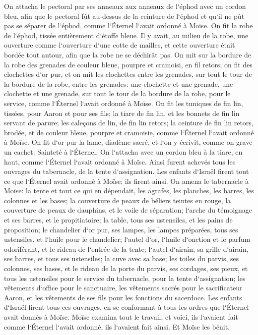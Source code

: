 \verse On attacha le pectoral par ses anneaux aux anneaux de l`éphod avec un cordon bleu, afin que le pectoral fût au-dessus de la ceinture de l`éphod et qu`il ne pût pas se séparer de l`éphod, comme l`Éternel l`avait ordonné à Moïse. 
\verse On fit la robe de l`éphod, tissée entièrement d`étoffe bleue. 
\verse Il y avait, au milieu de la robe, une ouverture comme l`ouverture d`une cotte de mailles, et cette ouverture était bordée tout autour, afin que la robe ne se déchirât pas. 
\verse On mit sur la bordure de la robe des grenades de couleur bleue, pourpre et cramoisi, en fil retors; 
\verse on fit des clochettes d`or pur, et on mit les clochettes entre les grenades, sur tout le tour de la bordure de la robe, entre les grenades: 
\verse une clochette et une grenade, une clochette et une grenade, sur tout le tour de la bordure de la robe, pour le service, comme l`Éternel l`avait ordonné à Moïse. 
\verse On fit les tuniques de fin lin, tissées, pour Aaron et pour ses fils; 
\verse la tiare de fin lin, et les bonnets de fin lin servant de parure; les caleçons de lin, de fin lin retors; 
\verse la ceinture de fin lin retors, brodée, et de couleur bleue, pourpre et cramoisie, comme l`Éternel l`avait ordonné à Moïse. 
\verse On fit d`or pur la lame, diadème sacré, et l`on y écrivit, comme on grave un cachet: Sainteté à l`Éternel. 
\verse On l`attacha avec un cordon bleu à la tiare, en haut, comme l`Éternel l`avait ordonné à Moïse. 
\verse Ainsi furent achevés tous les ouvrages du tabernacle, de la tente d`assignation. Les enfants d`Israël firent tout ce que l`Éternel avait ordonné à Moïse; ils firent ainsi. 
\verse On amena le tabernacle à Moïse: la tente et tout ce qui en dépendait, les agrafes, les planches, les barres, les colonnes et les bases; 
\verse la couverture de peaux de béliers teintes en rouge, la couverture de peaux de dauphins, et le voile de séparation; 
\verse l`arche du témoignage et ses barres, et le propitiatoire; 
\verse la table, tous ses ustensiles, et les pains de proposition; 
\verse le chandelier d`or pur, ses lampes, les lampes préparées, tous ses ustensiles, et l`huile pour le chandelier; 
\verse l`autel d`or, l`huile d`onction et le parfum odoriférant, et le rideau de l`entrée de la tente; 
\verse l`autel d`airain, sa grille d`airain, ses barres, et tous ses ustensiles; la cuve avec sa base; 
\verse les toiles du parvis, ses colonnes, ses bases, et le rideau de la porte du parvis, ses cordages, ses pieux, et tous les ustensiles pour le service du tabernacle, pour la tente d`assignation; 
\verse les vêtements d`office pour le sanctuaire, les vêtements sacrés pour le sacrificateur Aaron, et les vêtements de ses fils pour les fonctions du sacerdoce. 
\verse Les enfants d`Israël firent tous ces ouvrages, en se conformant à tous les ordres que l`Éternel avait donnés à Moïse. 
\verse Moïse examina tout le travail; et voici, ils l`avaient fait comme l`Éternel l`avait ordonné, ils l`avaient fait ainsi. Et Moïse les bénit. 


